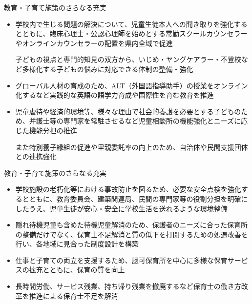 \documentclass[dvipdfmx]{beamer}
\begin{document}
    \begin{frame}{教育・子育て施策のさらなる充実}{}
        \begin{small}
            \begin{itemize}
                \setlength{\parsep}{.5mm}
                \setlength{\itemsep}{2mm}
                \item 学校内で生じる問題の解決について、児童生徒本人への聞き取りを強化するとともに、臨床心理士・公認心理師を始めとする常勤スクールカウンセラーやオンラインカウンセラーの配置を県内全域で促進\par
                子どもの視点と専門的知見の双方から、いじめ・ヤングケアラー・不登校など多様化する子どもの悩みに対応できる体制の整備・強化
                \item グローバル人材の育成のため、ALT（外国語指導助手）の授業をオンライン化するなど実践的な英語の語学力育成や国際性を育む教育を推進
                \item 児童虐待や経済的環境等、様々な理由で社会的養護を必要とする子どものため、弁護士等の専門家を常駐させるなど児童相談所の機能強化とニーズに応じた機能分担の推進\par
                また特別養子縁組の促進や里親委託率の向上のため、自治体や民間支援団体との連携強化
            \end{itemize}
        \end{small}
    \end{frame}

    \begin{frame}{教育・子育て施策のさらなる充実}{}
        \begin{small}
            \begin{itemize}
                \setlength{\parsep}{.5mm}
                \setlength{\itemsep}{2mm}
                \item 学校施設の老朽化等における事故防止を図るため、必要な安全点検を強化するとともに、教育委員会、建築関連局、民間の専門家等の役割分担を明確にしたうえ、児童生徒が安心・安全に学校生活を送れるような環境整備
                \item 隠れ待機児童も含めた待機児童解消のため、保護者のニーズに合った保育所の整備だけでなく、保育士不足解消と質の低下を打開するための処遇改善を行い、各地域に見合った制度設計を構築
                \item 仕事と子育ての両立を支援するため、認可保育所を中心に多様な保育サービスの拡充とともに、保育の質を向上
                \item 長時間労働、サービス残業、持ち帰り残業を撤廃するなど保育士の働き方改革を推進による保育士不足を解消
            \end{itemize}
        \end{small}
    \end{frame}
\end{document}
